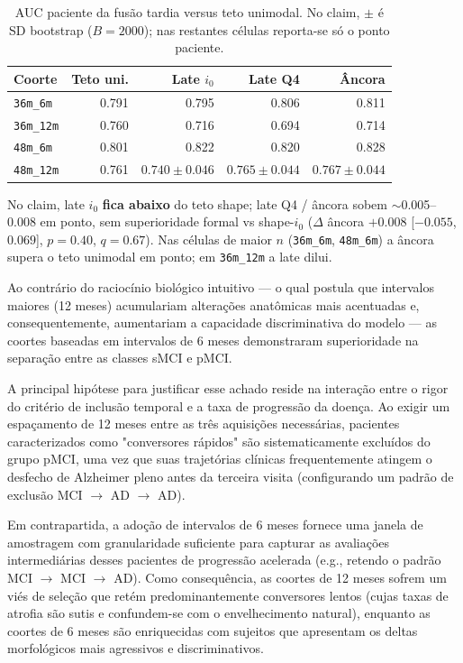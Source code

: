 \documentclass[review]{elsarticle}
\newcommand{\code}[1]{\texttt{#1}}
\begin{document}
\begin{table}[htbp]
	\centering
	\caption{AUC paciente da fusão tardia versus teto unimodal.
		No claim, $\pm$ é SD bootstrap ($B=2000$); nas restantes células reporta-se só o ponto paciente.}
	\label{tab:late_4}
	\begin{tabular}{lrrrr}
		\toprule
		Coorte & Teto uni. & Late $i_0$ & Late Q4 & Âncora \\
		\midrule
		\code{36m\_6m} & 0.791 & 0.795 & 0.806 & 0.811 \\
		\code{36m\_12m} & 0.760 & 0.716 & 0.694 & 0.714 \\
		\code{48m\_6m} & 0.801 & 0.822 & 0.820 & 0.828 \\
		\code{48m\_12m} & 0.761 & $0.740\pm 0.046$ & $0.765\pm 0.044$ & $0.767\pm 0.044$ \\
		\bottomrule
	\end{tabular}
\end{table}

No claim, late $i_0$ \textbf{fica abaixo} do teto shape; late Q4 / âncora sobem $\sim$0.005--0.008
em ponto, sem superioridade formal vs shape-$i_0$
($\Delta$ âncora $+0.008$ [$-0.055$, $0.069$], $p=0.40$, $q=0.67$).
Nas células de maior $n$ (\code{36m\_6m}, \code{48m\_6m}) a âncora supera o teto unimodal em ponto;
em \code{36m\_12m} a late dilui.

Ao contrário do raciocínio biológico intuitivo --- o qual postula que intervalos maiores (12 meses) acumulariam alterações anatômicas mais acentuadas e, consequentemente, aumentariam a capacidade discriminativa do modelo --- as coortes baseadas em intervalos de 6 meses demonstraram superioridade na separação entre as classes sMCI e pMCI. 

A principal hipótese para justificar esse achado reside na interação entre o rigor do critério de inclusão temporal e a taxa de progressão da doença. Ao exigir um espaçamento de 12 meses entre as três aquisições necessárias, pacientes caracterizados como "conversores rápidos" são sistematicamente excluídos do grupo pMCI, uma vez que suas trajetórias clínicas frequentemente atingem o desfecho de Alzheimer pleno antes da terceira visita (configurando um padrão de exclusão MCI $\to$ AD $\to$ AD). 

Em contrapartida, a adoção de intervalos de 6 meses fornece uma janela de amostragem com granularidade suficiente para capturar as avaliações intermediárias desses pacientes de progressão acelerada (e.g., retendo o padrão MCI $\to$ MCI $\to$ AD). Como consequência, as coortes de 12 meses sofrem um viés de seleção que retém predominantemente conversores lentos (cujas taxas de atrofia são sutis e confundem-se com o envelhecimento natural), enquanto as coortes de 6 meses são enriquecidas com sujeitos que apresentam os deltas morfológicos mais agressivos e discriminativos.
\end{document}
